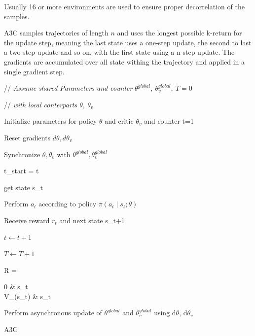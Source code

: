 Usually 16 or more environments are used to ensure proper decorrelation of the samples.

\pagebreak
A3C samples trajectories of length $n$ and uses the longest possible k-return for the update step, meaning the last state uses a one-step update, the second to last a two-step update and so on, with the first state using a n-step update.
The gradients are accumulated over all state withing the trajectory and applied in a single gradient step. 

\begin{algorithm}[t]
// \textit{ Assume shared Parameters and counter} $ \theta^{global} ,\ \theta^{global}_v,\ T = 0 $

// \textit{ with local conterparts $\theta,\ \theta_v$}

 Initialize parameters for policy $\theta$ and critic $\theta_v$ and counter t=1
 
 { 
 Reset gradients $d\theta, d\theta_v$
 
 Synchronize $ \theta, \theta_v$ with $\theta^{global} ,\theta^{global}_v$
 
 t_{start} = t
 
 get state s_t

 {
 
 \State Perform $a_t$ according to policy $\pi (a_t \mid s_t;\theta)$
 
 Receive reward $r_t$ and next state s_{t+1}
 
 $t \gets t + 1$
 
 $T \gets T + 1$

 }
 R = \begin{cases} 
 0 &  s_t  \\
 V_{\theta}(s_t) & s_t 
 \end{cases} %
 
 Perform asynchronous update of $\theta^{global}$ and $\theta^{global}_v$ using d$\theta$, d$\theta_v$
 }

 \caption{A3C \citep{A3C}}
\end{algorithm}
